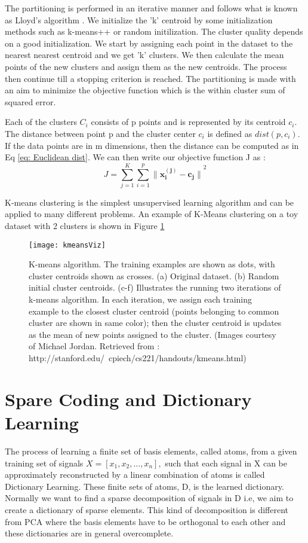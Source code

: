 The partitioning is performed in an iterative manner and follows what is known as Lloyd's algorithm \cite{lloydsalgo}. We initialize the 'k' centroid by some initialization methods such as k-means++ or random initilization. The cluster quality depends on a good initialization. We start by assigning each point in the dataset to the nearest nearest centroid and we get 'k' clusters. We then calculate the mean points of the new clusters and assign them as the new centroids. The process then continue till a stopping criterion is reached. The partitioning is made with an aim to minimize the objective function which is the within cluster sum of squared error.

Each of the clusters $C_i$ consists of p points and is represented by its centroid $c_i$. The distance between point p and the cluster center $c_i$ is defined as $dist(p,c_i)$. If the data points are in m dimensions, then the distance can be computed as in Eq \ref{eq: Euclidean dist}. We can then write our objective function J as :
\begin{equation}
J = \sum\limits_{j=1}^{K} \sum\limits_{i=1}^{p} {\lVert\mathbf{x^{(j)}_i - c_j}  \rVert}^2
\end{equation}

K-means clustering is the simplest unsupervised learning algorithm and can be applied to many different problems. An example of K-Means clustering on a toy dataset with 2 clusters is shown in Figure \ref{fig:kmeansvisz}
\begin{figure}
	\centering
	\texttt{[image: kmeansViz]}
	\caption[K-Means Visualization]{ K-means algorithm. The training examples are shown as dots, with cluster centroids shown as crosses. (a) Original dataset. (b) Random initial cluster centroids. (c-f) Illustrates the running two iterations of k-means algorithm. In each iteration, we assign each training example to the closest cluster centroid (points belonging to common cluster are shown in same color); then the cluster centroid is updates as the mean of new points assigned to the cluster. (Images courtesy of Michael Jordan. Retrieved from : http://stanford.edu/~cpiech/cs221/handouts/kmeans.html)}
	\label{fig:kmeansvisz}
\end{figure}

\section{Spare Coding and Dictionary Learning}\label{sec:dlsparse}
The process of learning a finite set of basis elements, called atoms, from a given training set of signals $X=[x_1,x_2,...,x_n], $ such that each signal in X can be approximately reconstructed by a linear combination of atoms is called Dictionary Learning. These finite sets of atoms, D, is the learned dictionary. Normally we want to find a sparse decomposition of signals in D i.e, we aim to create a dictionary of sparse elements. This kind of decomposition is different from PCA where the basis elements have to be orthogonal to each other and these dictionaries are in general overcomplete.\\

